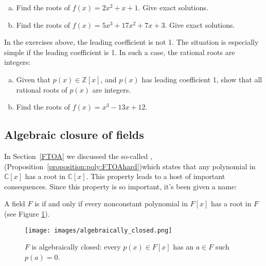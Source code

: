 \begin{exercise}\label{exercise:rings:complexroots}
\begin{enumerate}[(a)]
\item
Find the roots of $f(x)=2x^2+x+1$. Give exact solutions.
\item
Find the roots of $f(x)=5x^3+17x^2+7x+3$. Give exact solutions. 
\end{enumerate}
\end{exercise}
 
In the exercises above, the leading coefficient is not 1. The situation is especially simple if the leading coefficient is 1. In such a case, the rational  roots are integers:

\begin{exercise}
\begin{enumerate}[(a)]
\item
Given that $p(x)  \in \mathbb{Z}[x]$, and $p(x)$ has leading coefficient 1, show that all rational roots of $p(x)$ are integers.
\item
Find the roots of $f(x)=x^3-13x+12$.
\end{enumerate}
\end{exercise}


\subsection{Algebraic closure of fields}

In Section~\ref{FTOA} we discussed the so-called , (Proposition~\ref{proposition:poly:FTOAhard})which states that any polynomial in $\mathbb{C}[x]$ has a root in $\mathbb{C}[x]$. This property leads to a host of important consequences.  Since this property is so important, it's been given a name:

\begin{defn}\label{def:algclosed}  
A field $F$ is  if and only if every nonconstant polynomial in $F[x]$ has a root in $F$ (see Figure \ref{algebraicallyclosed}).
\end{defn}

\begin{figure}
\begin{center}
\texttt{[image: images/algebraically\_closed.png]}
\caption{$F$ is algebraically closed: every $p(x)\in F[x]$ has an $a\in F$ such  $p(a)=0$.}\label{algebraicallyclosed}
\end{center}
\end{figure}

